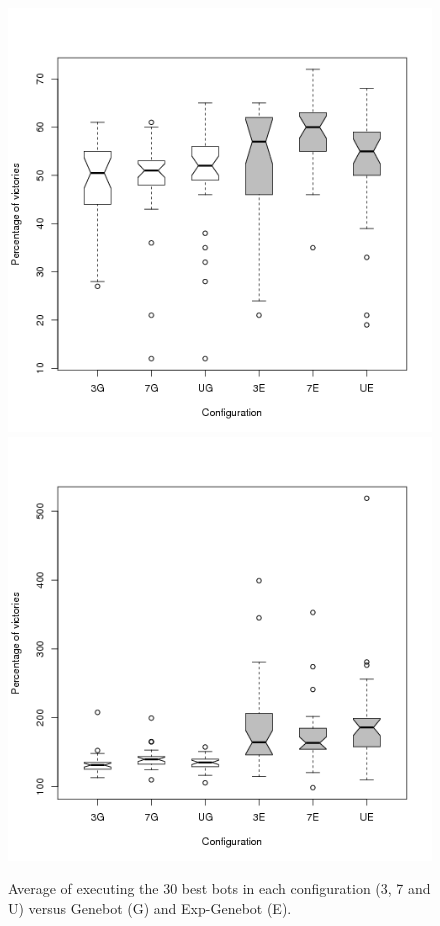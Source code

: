 {\begin{figure}
   \includegraphics[scale =0.30] {gfx/rts/victories.png}
   \label{fig:subfig1}
   \includegraphics[scale =0.30] {gfx/rts/turns.png}
   \label{fig:subfig2}
\caption{Average of executing the 30 best bots in each configuration (3, 7 and U) versus Genebot (G) and Exp-Genebot (E).}


\end{figure}}
